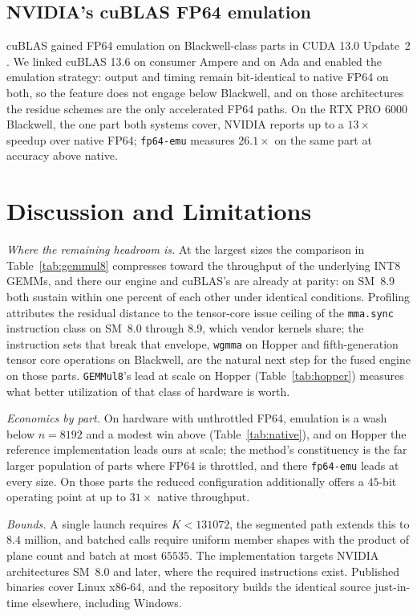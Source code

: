 \documentclass[11pt]{amsart}
\theoremstyle{plain}
\theoremstyle{definition}
\newcommand{\code}[1]{\texttt{#1}}
\newcommand{\fpemu}{\code{fp64-emu}}
\newcommand{\gemmul}{\code{GEMMul8}}
\begin{document}
\subsection{NVIDIA's cuBLAS FP64 emulation}\label{sec:cublasemu}

cuBLAS gained FP64 emulation on Blackwell-class parts in CUDA 13.0
Update~2 \cite{nvidiablog}. We linked cuBLAS 13.6 on consumer Ampere and
on Ada and enabled the emulation strategy: output and timing remain
bit-identical to native FP64 on both, so the feature does not engage
below Blackwell, and on those architectures the residue schemes are the
only accelerated FP64 paths. On the RTX PRO 6000 Blackwell, the one part
both systems cover, NVIDIA reports up to a $13\times$ speedup over native
FP64; \fpemu{} measures $26.1\times$ on the same part at accuracy above
native.

\section{Discussion and Limitations}\label{sec:discussion}

\emph{Where the remaining headroom is.} At the largest sizes the
comparison in Table~\ref{tab:gemmul8} compresses toward the throughput of
the underlying INT8 GEMMs, and there our engine and cuBLAS's are already
at parity: on SM~8.9 both sustain within one percent of each other under
identical conditions. Profiling attributes the residual distance to the
tensor-core issue ceiling of the \code{mma.sync} instruction class on
SM~8.0 through 8.9, which vendor kernels share; the instruction sets that
break that envelope, \code{wgmma} on Hopper and fifth-generation tensor
core operations on Blackwell, are the natural next step for the fused
engine on those parts. \gemmul{}'s lead at scale on Hopper
(Table~\ref{tab:hopper}) measures what better utilization of that class
of hardware is worth.

\emph{Economics by part.} On hardware with unthrottled FP64, emulation is
a wash below $n = 8192$ and a modest win above (Table~\ref{tab:native}),
and on Hopper the reference implementation leads ours at scale; the
method's constituency is the far larger population of parts where FP64 is
throttled, and there \fpemu{} leads at every size. On those parts the
reduced configuration additionally offers a $45$-bit operating point at
up to $31\times$ native throughput.

\emph{Bounds.} A single launch requires $K < 131072$, the segmented path
extends this to $8.4$ million, and batched calls require uniform member
shapes with the product of plane count and batch at most $65535$. The
implementation targets NVIDIA architectures SM~8.0 and later, where the
required instructions exist. Published binaries cover Linux x86-64, and
the repository builds the identical source just-in-time elsewhere,
including Windows.
\end{document}
